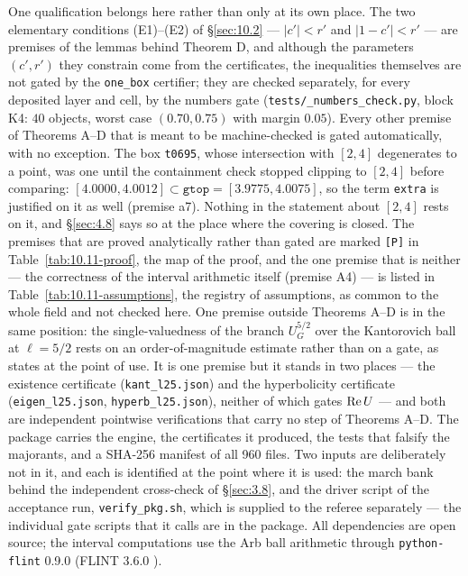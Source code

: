 One qualification belongs here rather than only at its own place. The two
elementary conditions (E1)--(E2) of \S\ref{sec:10.2} --- $|c'| < r'$ and
$|1-c'| < r'$ --- are premises of the lemmas behind Theorem D, and although the
parameters $(c', r')$ they constrain come from the certificates, the
inequalities themselves are not gated by the \texttt{one\_box} certifier; they
are checked separately, for every deposited layer and cell, by the numbers gate
(\texttt{tests/\allowbreak \_\allowbreak numbers\_\allowbreak check.py}, block K4:
$40$ objects, worst case $(0.70, 0.75)$ with margin $0.05$).
Every other premise of Theorems A--D that is meant to be machine-checked is
gated automatically, with no exception. The box \texttt{t0695}, whose
intersection with $[2,4]$ degenerates to a point, was one until the containment
check stopped clipping to $[2,4]$ before comparing: $[4.0000, 4.0012]
\subset \texttt{gtop} = [3.9775, 4.0075]$, so the term \texttt{extra} is
justified on it as well (premise a7). Nothing in the
statement about $[2,4]$ rests on it, and \S\ref{sec:4.8} says so at the place
where the covering is closed. The premises that are proved analytically rather
than gated are marked \texttt{[P]} in
Table~\ref{tab:10.11-proof}, the map of the proof, and the one
premise that is neither --- the correctness of the interval arithmetic itself
(premise A4) --- is listed in Table~\ref{tab:10.11-assumptions}, the registry
of assumptions, as common to the whole field and not checked
here.
One premise outside Theorems A--D is in the same position: the
single-valuedness of the branch $U_G^{5/2}$ over the Kantorovich ball at
$\ell = 5/2$ rests on an order-of-magnitude estimate rather than on a gate, as
 states at the point of use. It is one premise but it stands in
two places --- the existence certificate (\texttt{kant\_\allowbreak l25.json})
and the hyperbolicity certificate (\texttt{eigen\_\allowbreak l25.json},
\texttt{hyperb\_\allowbreak l25.json}), neither of which gates
$\operatorname{Re} U$ --- and both are independent pointwise verifications that carry no
step of Theorems A--D.
The package carries the
engine, the certificates it produced, the tests that falsify the majorants, and
a SHA-256 manifest of all 960 files. Two inputs are deliberately not in it, and
each is identified at the point where it is used: the march bank behind the
independent cross-check of \S\ref{sec:3.8}, and the driver script of
the acceptance run, \texttt{verify\_\allowbreak pkg.sh}, which is supplied to the
referee separately --- the individual gate scripts that it calls are in the
package. All
dependencies are open source; the interval computations use the Arb ball
arithmetic \cite{johansson2017arb} through \texttt{python-flint} 0.9.0
\cite{pythonflint} (FLINT 3.6.0 \cite{flint}).

